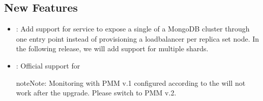 \documentclass[letterpaper,10pt,english]{sphinxmanual}
\begin{document}
\subsection{New Features}
\label{\detokenize{RN/Kubernetes-Operator-for-PSMONGODB-RN1.6.0:new-features}}\begin{itemize}
\item {} 
: Add support for  service to expose a single
{\hyperref[\detokenize{sharding:operator-sharding}]{}} of a MongoDB cluster through one entry point instead of
provisioning a load\sphinxhyphen{}balancer per replica set node. In the following release,
we will add support for multiple shards.

\item {} 
: Official support for {\hyperref[\detokenize{monitoring:operator-monitoring}]{}}

\begin{sphinxadmonition}{note}{Note:}
Monitoring with PMM v.1 configured according to the 
will not work after the upgrade. Please switch to PMM v.2.
\end{sphinxadmonition}

\end{itemize}
\end{document}
